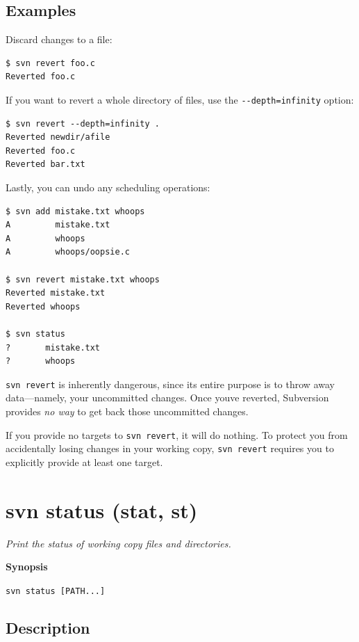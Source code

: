 \subsection{Examples}

Discard changes to a file:

\begin{verbatim}
$ svn revert foo.c
Reverted foo.c
\end{verbatim}

If you want to revert a whole directory of files, use the
\texttt{-\/-depth=infinity} option:

\begin{verbatim}
$ svn revert --depth=infinity .
Reverted newdir/afile
Reverted foo.c
Reverted bar.txt
\end{verbatim}

Lastly, you can undo any scheduling operations:

\begin{verbatim}
$ svn add mistake.txt whoops
A         mistake.txt
A         whoops
A         whoops/oopsie.c

$ svn revert mistake.txt whoops
Reverted mistake.txt
Reverted whoops

$ svn status
?       mistake.txt
?       whoops
\end{verbatim}

\texttt{svn\ revert} is inherently dangerous, since its entire purpose
is to throw away data---namely, your uncommitted changes. Once
you\textquotesingle ve reverted, Subversion provides \emph{no way} to
get back those uncommitted changes.

If you provide no targets to \texttt{svn\ revert}, it will do nothing.
To protect you from accidentally losing changes in your working copy,
\texttt{svn\ revert} requires you to explicitly provide at least one
target.

\section{svn status (stat, st)}\label{svn.ref.svn.c.status}

\emph{Print the status of working copy files and directories.}

\textbf{Synopsis}

\texttt{svn\ status\ {[}PATH...{]}}

\subsection{Description}

